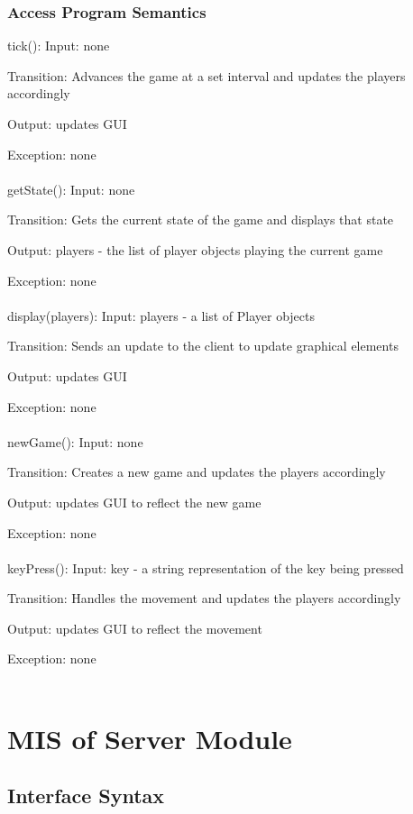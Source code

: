 \documentclass[12,english]{article}
\begin{document}
			\subsubsection{Access Program Semantics}
			
			tick():
			Input: none
			
			Transition: Advances the game at a set interval and updates the players accordingly
		
			Output: updates GUI
			
			Exception: none\\
			\\	
			getState():
			Input: none
			
			Transition: Gets the current state of the game and displays that state
		
			Output: players - the list of player objects playing the current game
			
			Exception: none\\
			\\	
			display(players):
			Input: players - a list of Player objects
			
			Transition: Sends an update to the client to update graphical elements
		
			Output: updates GUI
			
			Exception: none\\
			\\	
			newGame():
			Input: none
			
			Transition: Creates a new game and updates the players accordingly
		
			Output: updates GUI to reflect the new game
			
			Exception: none\\
			\\	
			keyPress():
			Input: key - a string representation of the key being pressed
			
			Transition: Handles the movement and updates the players accordingly
		
			Output: updates GUI to reflect the movement
			
			Exception: none\\
			\\
			
			
\section{MIS of Server Module}
	\subsection{Interface Syntax}
\end{document}
